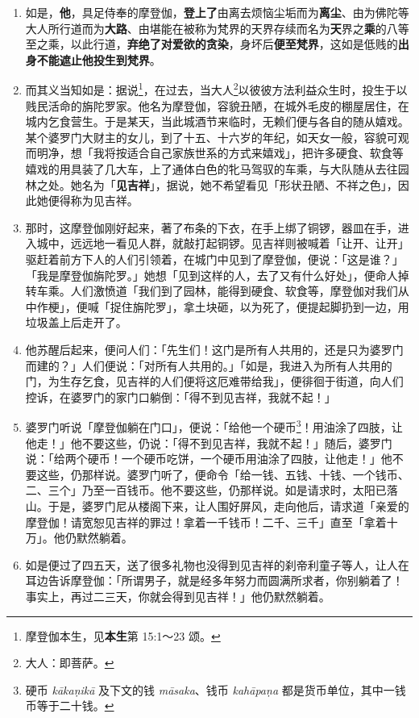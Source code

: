 \begin{enumerate}\item 如是，\textbf{他}，具足侍奉的摩登伽，\textbf{登上了}由离去烦恼尘垢而为\textbf{离尘}、由为佛陀等大人所行道而为\textbf{大路}、由堪能在被称为梵界的天界存续而名为\textbf{天}界之\textbf{乘}的八等至之乘，以此行道，\textbf{弃绝了对爱欲的贪染}，身坏后\textbf{便至梵界}，这如是低贱的\textbf{出身不能遮止他投生到梵界}。
\item 而其义当知如是：据说\footnote{摩登伽本生，见\textbf{本生}第 15:1～23 颂。}，在过去，当大人\footnote{大人：即菩萨。}以彼彼方法利益众生时，投生于以贱民活命的旃陀罗家。他名为摩登伽，容貌丑陋，在城外毛皮的棚屋居住，在城内乞食营生。于是某天，当此城酒节来临时，无赖们便与各自的随从嬉戏。某个婆罗门大财主的女儿，到了十五、十六岁的年纪，如天女一般，容貌可观而明净，想「我将按适合自己家族世系的方式来嬉戏」，把许多硬食、软食等嬉戏的用具装了几大车，上了通体白色的牝马驾驭的车乘，与大队随从去往园林之处。她名为「\textbf{见吉祥}」，据说，她不希望看见「形状丑陋、不祥之色」，因此她便得称为见吉祥。
\item 那时，这摩登伽刚好起来，著了布条的下衣，在手上绑了铜锣，器皿在手，进入城中，远远地一看见人群，就敲打起铜锣。见吉祥则被喊着「让开、让开」驱赶着前方下人的人们引领着，在城门中见到了摩登伽，便说：「这是谁？」「我是摩登伽旃陀罗。」她想「见到这样的人，去了又有什么好处」，便命人掉转车乘。人们激愤道「我们到了园林，能得到硬食、软食等，摩登伽对我们从中作梗」，便喊「捉住旃陀罗」，拿土块砸，以为死了，便提起脚扔到一边，用垃圾盖上后走开了。
\item 他苏醒后起来，便问人们：「先生们！这门是所有人共用的，还是只为婆罗门而建的？」人们便说：「对所有人共用的。」「如是，我进入为所有人共用的门，为生存乞食，见吉祥的人们便将这厄难带给我」，便徘徊于街道，向人们控诉，在婆罗门的家门口躺倒：「得不到见吉祥，我就不起！」
\item 婆罗门听说「摩登伽躺在门口」，便说：「给他一个硬币\footnote{硬币 \textit{kākaṇikā} 及下文的钱 \textit{māsaka}、钱币 \textit{kahāpaṇa} 都是货币单位，其中一钱币等于二十钱。}！用油涂了四肢，让他走！」他不要这些，仍说：「得不到见吉祥，我就不起！」随后，婆罗门说：「给两个硬币！一个硬币吃饼，一个硬币用油涂了四肢，让他走！」他不要这些，仍那样说。婆罗门听了，便命令「给一钱、五钱、十钱、一个钱币、二、三个」乃至一百钱币。他不要这些，仍那样说。如是请求时，太阳已落山。于是，婆罗门尼从楼阁下来，让人围好屏风，走向他后，请求道「亲爱的摩登伽！请宽恕见吉祥的罪过！拿着一千钱币！二千、三千」直至「拿着十万」。他仍默然躺着。
\item 如是便过了四五天，送了很多礼物也没得到见吉祥的刹帝利童子等人，让人在耳边告诉摩登伽：「所谓男子，就是经多年努力而圆满所求者，你别躺着了！事实上，再过二三天，你就会得到见吉祥！」他仍默然躺着。

\end{enumerate}
